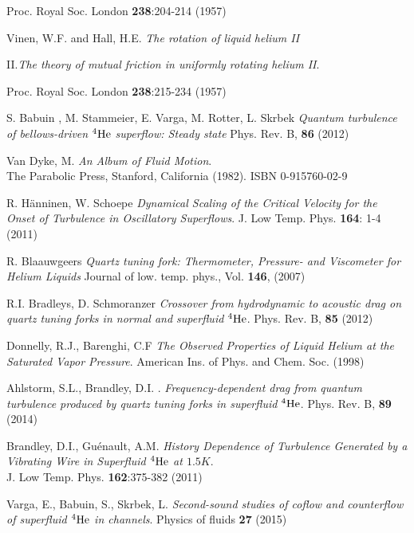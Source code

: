 \begin{thebibliography}{99}
Proc. Royal Soc. London \textbf{238}:204-214 (1957) 

{\sc Vinen, W.F.} and {\sc Hall, H.E.}
\emph{The rotation of liquid helium II}

II.\hspace{2mm}\emph{The theory of mutual friction in uniformly rotating helium II}.

Proc. Royal Soc. London \textbf{238}:215-234 (1957)

{\sc S. Babuin , M. Stammeier, E. Varga, M. Rotter, L. Skrbek  }
\emph{Quantum turbulence of bellows-driven ${}^4\mathrm{He}$ superflow: Steady state} Phys. Rev. B, \textbf{86} (2012)

{\sc Van Dyke, M.}
\emph{An Album of Fluid Motion}.\\
The Parabolic Press, Stanford, California (1982). ISBN 0-915760-02-9

{\sc R. Hänninen, W. Schoepe}
\emph{Dynamical Scaling of the Critical Velocity for the Onset of Turbulence in Oscillatory Superflows}.
J. Low Temp. Phys. \textbf{164}: 1-4 (2011)

{\sc R. Blaauwgeers} 
\emph{Quartz tuning fork: Thermometer, Pressure- and Viscometer for Helium Liquids} Journal of low. temp. phys., Vol. \textbf{146}, (2007)

{\sc R.I. Bradleys, D. Schmoranzer} 
\emph{Crossover from hydrodynamic to acoustic drag on quartz tuning forks in normal and superfluid $ {}^4\mathrm{He} $}. Phys. Rev. B, \textbf{85} (2012)

{\sc Donnelly, R.J., Barenghi, C.F}
\emph{The Observed Properties of Liquid Helium at the Saturated Vapor Pressure}. American Ins. of Phys. and Chem. Soc. (1998)

{\sc Ahlstorm, S.L., Brandley, D.I.} .
\emph{Frequency-dependent drag from quantum turbulence produced by quartz tuning forks in superfluid $ {}^4\mathrm{He} $}.
Phys. Rev. B, \textbf{89} (2014)

{\sc Brandley, D.I., Guénault, A.M.} 
\emph{History Dependence of Turbulence Generated by a Vibrating Wire in Superfluid $ {}^4\mathrm{He} $ at $ 1.5\unit{K} $}.\\
J. Low Temp. Phys. \textbf{162}:375-382 (2011)

{\sc Varga, E., Babuin, S., Skrbek, L.}
\emph{Second-sound studies of coflow and counterflow of superfluid $ {}^4\mathrm{He} $ in channels}.
Physics of fluids \textbf{27} (2015)


\end{thebibliography}
